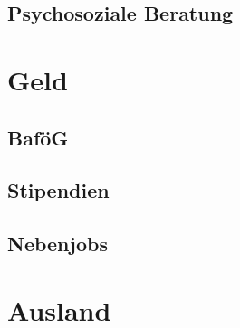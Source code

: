 \documentclass[12pt, a4paper]{article}
\newif\ifinfo
\begin{document}
\ifinfo
	\subsection{Ansprechpartner nach Studiengängen}
	

	\subsection{Prüfungssekretariate}
	

	\subsection{Studierendensekretariat}
	
\fi
\subsection{Psychosoziale Beratung}




\newpage
\section{Geld}

\subsection{BaföG}


\subsection{Stipendien}


\subsection{Nebenjobs}


\ifinfo
	\newpage
\fi

\section{Ausland}


\newpage
%
\end{document}
